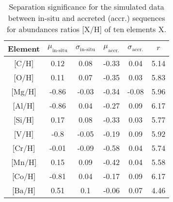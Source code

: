 \begin{table}
    \centering
    \caption{Separation significance for the simulated data between in-situ and accreted (accr.) sequences for abundances ratios [X/H] of ten elements X.}
    \begin{tabular}{cccccc}
    \hline
    Element & $\mu_\text{in-situ}$ & $\sigma_\text{in-situ}$ & $\mu_\text{accr.}$ & $\sigma_\text{accr.}$ & $r$\\
    \hline \hline
    {[C/H]}  & 0.12 & 0.08 & -0.33 & 0.04 & 5.14 \\
    {[O/H]}  & 0.11 & 0.07 & -0.35 & 0.03 & 5.83 \\
    {[Mg/H]}  & -0.86 & -0.03 & -0.34 & -0.08 & 5.96 \\
    {[Al/H]}  & -0.86 & 0.04 & -0.27 & 0.09 & 6.17 \\
    {[Si/H]}  & 0.17 & 0.08 & -0.33 & 0.03 & 5.77 \\
    {[V/H]}  & -0.8 & -0.05 & -0.19 & 0.09 & 5.92 \\
    {[Cr/H]}  & -0.01 & -0.09 & -0.58 & 0.04 & 5.74 \\
    {[Mn/H]}  & 0.15 & 0.09 & -0.42 & 0.04 & 5.58 \\
    {[Co/H]}  & -0.81 & 0.04 & -0.17 & 0.09 & 6.17 \\
    {[Ba/H]}  & 0.51 & 0.1 & -0.06 & 0.07 & 4.46 \\
    \hline
    \end{tabular}
    \label{tab:separation_significance_two_sequences}
\end{table}

